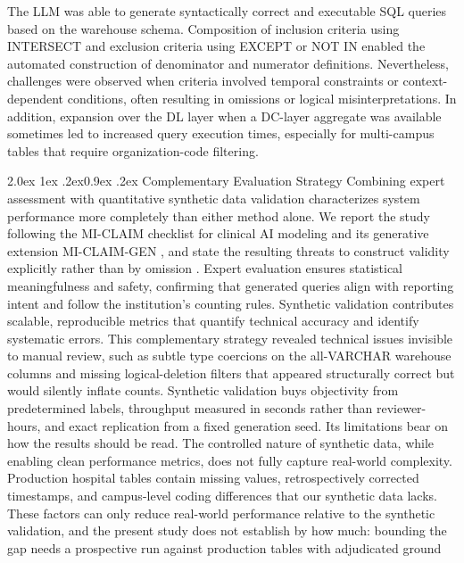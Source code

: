 \documentclass[10pt]{article}
\makeatletter
\renewcommand\subsection{\@startsection{subsection}{2}{\z@}%
  {2.0ex \@plus 1ex \@minus .2ex}{0.9ex \@plus .2ex}%
  {\normalfont\normalsize\bfseries}}
\makeatother
\begin{document}
The LLM was able to generate syntactically correct and executable SQL queries
based on the warehouse schema. Composition of inclusion criteria using
INTERSECT and exclusion criteria using EXCEPT or NOT IN enabled the automated
construction of denominator and numerator definitions. Nevertheless, challenges
were observed when criteria involved temporal constraints or context-dependent
conditions, often resulting in omissions or logical misinterpretations. In
addition, expansion over the DL layer when a DC-layer aggregate was available
sometimes led to increased query execution times, especially for multi-campus
tables that require organization-code filtering.

\subsection{Complementary Evaluation Strategy}
Combining expert assessment with quantitative synthetic data validation characterizes system performance more completely than either method alone. We report the study following the MI-CLAIM checklist for clinical AI modeling and its generative extension MI-CLAIM-GEN \cite{miclaim2020,miclaimgen2024}, and state the resulting threats to construct validity explicitly rather than by omission \cite{validity2023}.
Expert evaluation
ensures statistical meaningfulness and safety, confirming that generated queries
align with reporting intent and follow the institution's counting rules.
Synthetic validation contributes scalable, reproducible metrics that quantify
technical accuracy and identify systematic errors. This complementary strategy
revealed technical issues invisible to manual review, such as subtle type
coercions on the all-VARCHAR warehouse columns and missing logical-deletion
filters that appeared structurally correct but would silently inflate counts.
Synthetic validation buys objectivity from predetermined labels, throughput measured in seconds rather than reviewer-hours, and exact replication from a fixed generation seed. Its limitations bear on how the results should be read. The controlled nature of synthetic data, while enabling
clean performance metrics, does not fully capture real-world complexity.
Production hospital tables contain missing values, retrospectively corrected
timestamps, and campus-level coding differences that our synthetic data lacks.
These factors can only reduce real-world performance relative to the synthetic
validation, and the present study does not establish by how much: bounding the
gap needs a prospective run against production tables with adjudicated ground
\end{document}
